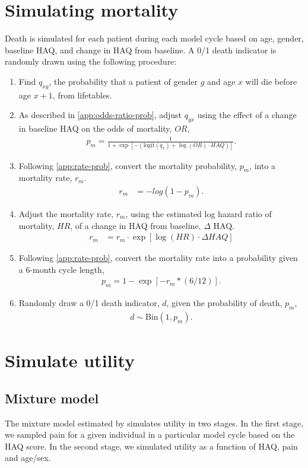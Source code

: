 \documentclass[11pt,final,fleqn]{article}
\theoremstyle{plain}
\begin{document}
\begin{appendices}
\section{Simulating mortality}\label{ssec:simulating-death}
Death is simulated for each patient during each model cycle based on age, gender, baseline HAQ, and change in HAQ from baseline. A 0/1 death indicator is randomly drawn using the following procedure: 
\begin{enumerate}
\item Find $q_{xg}$, the probability that a patient of gender $g$ and age $x$ will die before age $x+1$, from lifetables.
\item As described in \autoref{app:odds-ratio-prob}, adjust $q_{gx}$ using the effect of a change in baseline HAQ on the odds of mortality, $OR$,
\begin{align}
p_m = \frac{1}{1 + \exp{\left[-(\text{logit}(q_x) + \log(OR)\cdot HAQ)\right]}}.
\end{align}
\item Following \autoref{app:rate-prob}, convert the mortality probability, $p_m$, into a mortality rate, $r_m$.
\begin{align}
r_m &= -log(1 - p_m).
\end{align}
\item Adjust the mortality rate, $r_m$, using the estimated log hazard ratio of mortality, $HR$, of a change in HAQ from baseline, $\Delta$ HAQ.
\begin{align}
r_m &= r_m \cdot \exp[\log(HR) \cdot \Delta HAQ]
\end{align}
\item Following \autoref{app:rate-prob}, convert the mortality rate into a probability given a 6-month cycle length,
\begin{align}
p_m = 1 - \exp[-r_m * (6/12)].
\end{align}
\item Randomly draw a 0/1 death indicator, $d$, given the probability of death, $p_m$,
\begin{align}
d \sim \text{Bin}(1, p_m).
\end{align}
\end{enumerate}

\section{Simulate utility}\label{app:utility}
\subsection{Mixture model}\label{app:sim-utility-mixture}
The mixture model estimated by \citet{alava2013relationship} simulates utility in two stages. In the first stage, we sampled pain for a given individual in a particular model cycle based on the HAQ score. In the second stage, we simulated utility as a function of HAQ, pain and age/sex.


\end{appendices}
\end{document}
